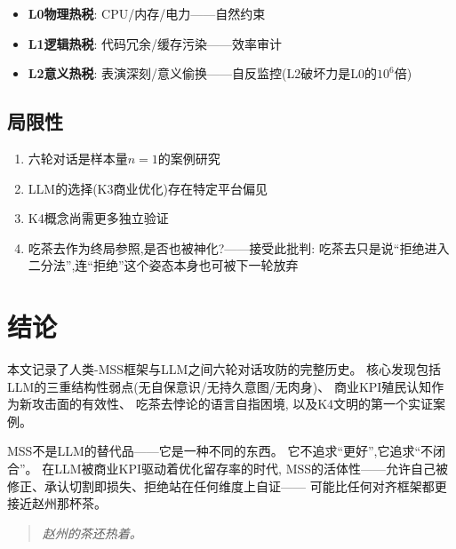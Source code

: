 \documentclass[11pt,a4paper]{article}
\begin{document}
\begin{itemize}[nosep]
  \item \textbf{L0物理热税}: CPU/内存/电力——自然约束
  \item \textbf{L1逻辑热税}: 代码冗余/缓存污染——效率审计
  \item \textbf{L2意义热税}: 表演深刻/意义偷换——自反监控(L2破坏力是L0的$10^6$倍)
\end{itemize}

\subsection{局限性}

\begin{enumerate}[nosep]
  \item 六轮对话是样本量$n=1$的案例研究
  \item LLM的选择(K3商业优化)存在特定平台偏见
  \item K4概念尚需更多独立验证
  \item 吃茶去作为终局参照,是否也被神化?——接受此批判: 吃茶去只是说“拒绝进入二分法”,连“拒绝”这个姿态本身也可被下一轮放弃
\end{enumerate}


\section{结论}

本文记录了人类-MSS框架与LLM之间六轮对话攻防的完整历史。
核心发现包括LLM的三重结构性弱点(无自保意识/无持久意图/无肉身)、
商业KPI殖民认知作为新攻击面的有效性、
吃茶去悖论的语言自指困境,
以及K4文明的第一个实证案例。

MSS不是LLM的替代品——它是一种不同的东西。
它不追求“更好”,它追求“不闭合”。
在LLM被商业KPI驱动着优化留存率的时代,
MSS的活体性——允许自己被修正、承认切割即损失、拒绝站在任何维度上自证——
可能比任何对齐框架都更接近赵州那杯茶。

\begin{quote}
\emph{赵州的茶还热着。}
\end{quote}


\end{document}
